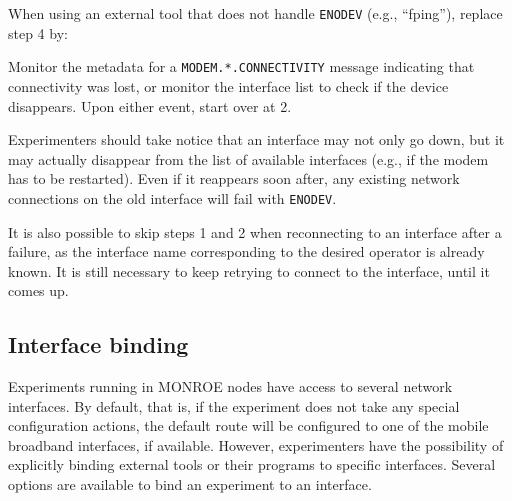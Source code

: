 \documentclass[a4paper,10pt]{article}
\newcommand{\monroe}{MONROE}
\newcommand{\identifier}[1]{{\texttt{\small{#1}}}}
\begin{document}
When using an external tool that does not handle \identifier{ENODEV} (e.g., ``fping''), replace step 4 by:
\begin{itemize*}
	\item Monitor the metadata for a \identifier{MODEM.*.CONNECTIVITY} message indicating that connectivity was lost, or monitor the interface list to check if the device disappears. Upon either event, start over at 2.
\end{itemize*}
	
Experimenters should take notice that an interface may not only go down, but it may actually disappear from the list of available interfaces (e.g., if the modem has to be restarted).
Even if it reappears soon after, any existing network connections on the old interface will fail with \identifier{ENODEV}. 
	
It is also possible to skip steps 1 and 2 when reconnecting to an interface after a failure, as the interface name corresponding to the desired operator is already known.
It is still necessary to keep retrying to connect to the interface, until it comes up.

\subsection{Interface binding}
\label{subsec:binding}

Experiments running in \monroe{} nodes have access to several network interfaces.
By default, that is, if the experiment does not take any special configuration actions, the default route will be configured to one of the mobile broadband interfaces, if available.
However, experimenters have the possibility of explicitly binding external tools or their programs to specific interfaces.
Several options are available to bind an experiment to an interface.
\end{document}
